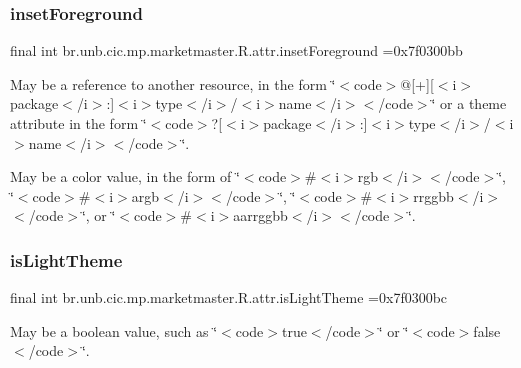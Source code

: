 \subsubsection{\texorpdfstring{inset\+Foreground}{insetForeground}}
{\footnotesize\ttfamily final int br.\+unb.\+cic.\+mp.\+marketmaster.\+R.\+attr.\+inset\+Foreground =0x7f0300bb\hspace{0.3cm}{\ttfamily [static]}}

May be a reference to another resource, in the form \char`\"{}$<$code$>$@\mbox{[}+\mbox{]}\mbox{[}$<$i$>$package$<$/i$>$\+:\mbox{]}$<$i$>$type$<$/i$>$/$<$i$>$name$<$/i$>$$<$/code$>$\char`\"{} or a theme attribute in the form \char`\"{}$<$code$>$?\mbox{[}$<$i$>$package$<$/i$>$\+:\mbox{]}$<$i$>$type$<$/i$>$/$<$i$>$name$<$/i$>$$<$/code$>$\char`\"{}. 

May be a color value, in the form of \char`\"{}$<$code$>$\#$<$i$>$rgb$<$/i$>$$<$/code$>$\char`\"{}, \char`\"{}$<$code$>$\#$<$i$>$argb$<$/i$>$$<$/code$>$\char`\"{}, \char`\"{}$<$code$>$\#$<$i$>$rrggbb$<$/i$>$$<$/code$>$\char`\"{}, or \char`\"{}$<$code$>$\#$<$i$>$aarrggbb$<$/i$>$$<$/code$>$\char`\"{}. \mbox{\label{classbr_1_1unb_1_1cic_1_1mp_1_1marketmaster_1_1R_1_1attr_ad6a98cf49852903f44a36cced7d937a5}} 
\subsubsection{\texorpdfstring{is\+Light\+Theme}{isLightTheme}}
{\footnotesize\ttfamily final int br.\+unb.\+cic.\+mp.\+marketmaster.\+R.\+attr.\+is\+Light\+Theme =0x7f0300bc\hspace{0.3cm}{\ttfamily [static]}}

May be a boolean value, such as \char`\"{}$<$code$>$true$<$/code$>$\char`\"{} or \char`\"{}$<$code$>$false$<$/code$>$\char`\"{}. \mbox{\label{classbr_1_1unb_1_1cic_1_1mp_1_1marketmaster_1_1R_1_1attr_a14f0b3948f7c204e8cb8bf3e5a83b4ca}} 
